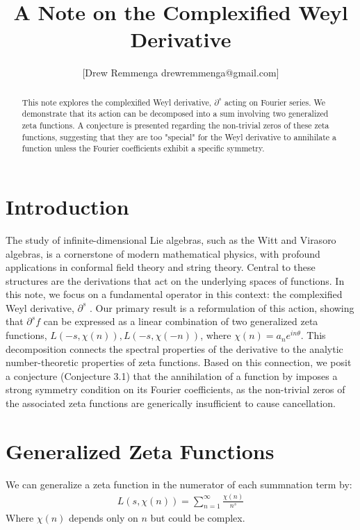 \documentclass{artjltcopy}
\title{A Note on the Complexified Weyl Derivative}
\author{[Drew Remmenga drewremmenga@gmail.com]}
\newcommand{\?}{\textbackslash}
\begin{document}
\maketitle
\begin{abstract}
  This note explores the complexified Weyl derivative, $\partial^s$ acting on Fourier series. 
We demonstrate that its action can be decomposed into a sum involving two generalized zeta functions. 
A conjecture is presented regarding the non-trivial zeros of these zeta functions, suggesting that they are too "special" for the Weyl derivative to annihilate a function unless the Fourier coefficients exhibit a specific symmetry.
\end{abstract}
\section{Introduction}
The study of infinite-dimensional Lie algebras, such as the Witt and Virasoro algebras, is a cornerstone of modern mathematical physics, with profound applications in conformal field theory and string theory. Central to these structures are the derivations that act on the underlying spaces of functions. In this note, we focus on a fundamental operator in this context: the complexified Weyl derivative, $\partial^s$ \cite{article}.
Our primary result is a reformulation of this action, showing that $\partial^s f$ can be expressed as a linear combination of two generalized zeta functions, $L(-s,\chi(n)), L(-s,\chi(-n))$, where $\chi(n) =a_n e^{i n \theta}$. This decomposition connects the spectral properties of the derivative to the analytic number-theoretic properties of zeta functions. Based on this connection, we posit a conjecture (Conjecture 3.1) that the annihilation of a function by imposes a strong symmetry condition on its Fourier coefficients, as the non-trivial zeros of the associated zeta functions are generically insufficient to cause cancellation.
\section{Generalized Zeta Functions}
We can generalize a zeta function in the numerator of each summnation term by:
\begin{align*}
  L(s,\chi(n)) = \sum_{n=1}^{\infty}\frac{\chi(n)}{n^s}
\end{align*}
Where $\chi(n)$ depends only on $n$ but could be complex. 
\end{document}
